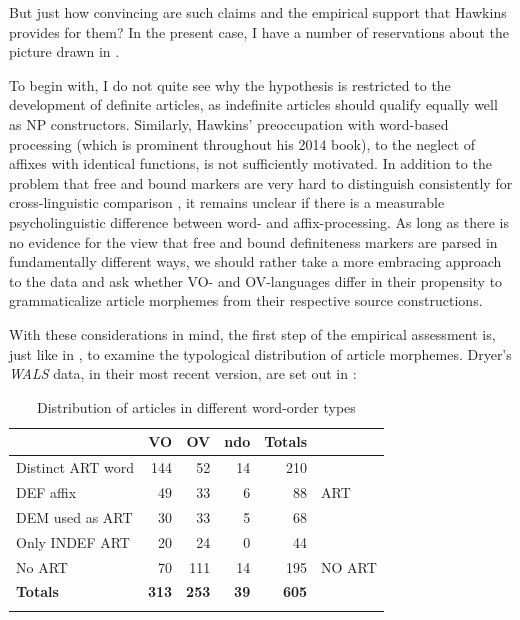 \documentclass[output=paper]{langsci/langscibook}
\begin{document}
But just how convincing are such claims and the empirical support that Hawkins provides for them? In the present case, I have a number of reservations about the picture drawn in \citet{Hawkins2014}.

To begin with, I do not quite see why the hypothesis is restricted to the development of definite articles, as indefinite articles should qualify equally well as NP constructors. Similarly, Hawkins’ preoccupation with word-based processing (which is prominent throughout his 2014 book), to the neglect of affixes with identical functions, is not sufficiently motivated. In addition to the problem that free and bound markers are very hard to distinguish consistently for cross-linguistic comparison \citep{Haspelmath2011}, it remains unclear if there is a measurable psycholinguistic difference between word- and affix-processing. As long as there is no evidence for the view that free and bound definiteness markers are parsed in fundamentally different ways, we should rather take a more embracing approach to the data and ask whether VO- and OV-languages differ in their propensity to grammaticalize article morphemes from their respective source constructions.

With these considerations in mind, the first step of the empirical assessment is, just like in \citet{Hawkins2014}, to examine the typological distribution of article morphemes. Dryer’s \textit{WALS} data, in their most recent version, are set out in :


\begin{table}
\begin{tabularx}{.8\textwidth}{lrrrrX}
\lsptoprule
& VO &  OV &  ndo &  Totals\\
\midrule
Distinct ART word & 144 & 52 & 14 & 210 & \\
DEF affix & 49 & 33 & 6 & 88 & ART\\
DEM used as ART & 30 & 33 & 5 & 68 & \\
Only INDEF ART & 20 & 24 & 0 & 44 & \\
\midrule
No ART & 70 & 111 & 14 & 195 & NO ART\\
\textbf{Totals} & \textbf{313} & \textbf{253} & \textbf{39} & \textbf{605} & \\
\lspbottomrule
\end{tabularx}  
\caption{Distribution of articles in different word-order types \citep{Dryer2013}}
\label{tab:ksb:1}
\end{table} 
\end{document}
